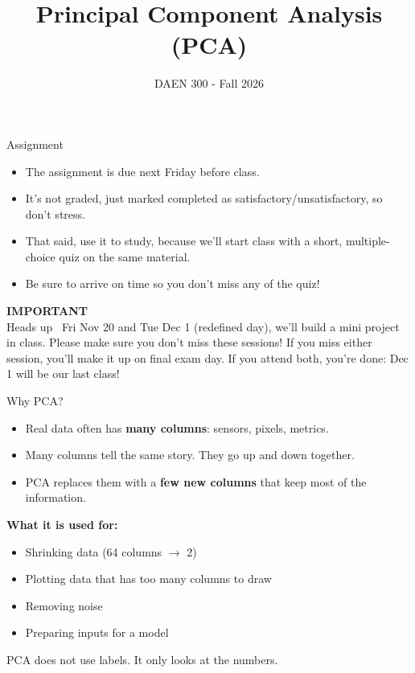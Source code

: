 \documentclass[aspectratio=43,11pt]{beamer}
\title{Principal Component Analysis (PCA)}
\author{DAEN 300 - Fall 2026}
\date{}
\begin{document}
\begin{frame}
  \titlepage
\end{frame}

\begin{frame}{Assignment}
  \begin{itemize}
    \item The assignment is due next Friday before class.
    \item It's not graded, just marked completed as satisfactory/unsatisfactory, so don't stress.
    \item That said, use it to study, because we'll start class with a short, multiple-choice quiz on the same material.
    \item Be sure to arrive on time so you don't miss any of the quiz!
  \end{itemize}
  \vspace{1em}
  {\bf IMPORTANT}\\Heads up \rightarrow~Fri Nov 20 and Tue Dec 1 (redefined day), we’ll build a mini project in class.
  Please make sure you don’t miss these sessions!
  If you miss either session, you'll make it up on final exam day. If you attend both, you're done: Dec 1 will be our last class!
\end{frame}

\begin{frame}{Why PCA?}
  \begin{itemize}
    \item Real data often has \textbf{many columns}: sensors, pixels, metrics.
    \item Many columns tell the same story. They go up and down together.
    \item PCA replaces them with a \textbf{few new columns} that keep most of the information.
  \end{itemize}
  \vspace{0.8em}
  \textbf{What it is used for:}
  \begin{itemize}
    \item Shrinking data (64 columns $\to$ 2)
    \item Plotting data that has too many columns to draw
    \item Removing noise
    \item Preparing inputs for a model
  \end{itemize}
  \vspace{0.5em}
  PCA does not use labels. It only looks at the numbers.
\end{frame}
\end{document}
